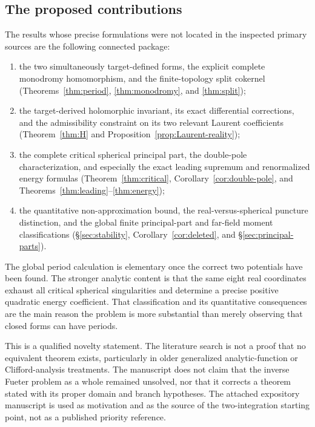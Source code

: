 \documentclass[11pt,a4paper]{article}
\numberwithin{equation}{section}
\theoremstyle{definition}
\theoremstyle{remark}
\begin{document}
\subsection{The proposed contributions}
The results whose precise formulations were not located in the inspected
primary sources are the following connected package:
\begin{enumerate}[label=\textup{(\alph*)}]
\item the two simultaneously target-defined forms, the explicit complete
monodromy homomorphism, and the finite-topology split cokernel
(Theorems~\ref{thm:period}, \ref{thm:monodromy}, and \ref{thm:split});
\item the target-derived holomorphic invariant, its exact differential
corrections, and the admissibility constraint on its two relevant
Laurent coefficients (Theorem~\ref{thm:H} and
Proposition~\ref{prop:Laurent-reality});
\item the complete critical spherical principal part, the double-pole
characterization, and especially the exact leading supremum and
renormalized energy formulas
(Theorem~\ref{thm:critical}, Corollary~\ref{cor:double-pole}, and
Theorems~\ref{thm:leading}--\ref{thm:energy});
\item the quantitative non-approximation bound, the real-versus-spherical
puncture distinction, and the global finite principal-part and far-field
moment classifications (\S\ref{sec:stability},
Corollary~\ref{cor:deleted}, and \S\ref{sec:principal-parts}).
\end{enumerate}
The global period calculation is elementary once the correct two
potentials have been found. The stronger analytic content is that the
same eight real coordinates exhaust all critical spherical singularities
and determine a precise positive quadratic energy coefficient. That
classification and its quantitative consequences are the main reason the
problem is more substantial than merely observing that closed forms can
have periods.

This is a qualified novelty statement. The literature search is not a
proof that no equivalent theorem exists, particularly in older generalized
analytic-function or Clifford-analysis treatments. The manuscript does
not claim that the inverse Fueter problem as a whole remained unsolved,
nor that it corrects a theorem stated with its proper domain and branch
hypotheses. The attached expository manuscript is used as motivation and
as the source of the two-integration starting point, not as a published
priority reference.
\end{document}
